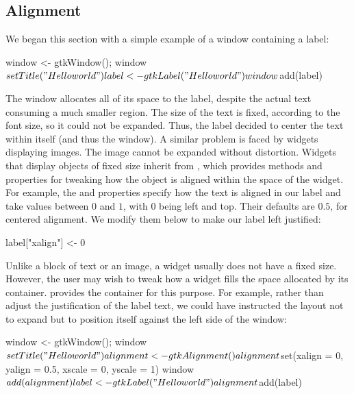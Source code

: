 \subsection{Alignment}
\label{sec:RGtk2:layout:align}

We began this section with a simple example of a window containing a
label:
\begin{Schunk}
\begin{Sinput}
 window <- gtkWindow(); window$setTitle("Hello world")
 label <- gtkLabel("Hello world")
 window$add(label)
\end{Sinput}
\end{Schunk}
%
The window allocates all of its space to the label, despite the actual
text consuming a much smaller region. The size of the text is fixed,
according to the font size, so it could not be expanded. Thus, the
label decided to center the text within itself (and thus the
window). A similar problem is faced by widgets displaying images. The
image cannot be expanded without distortion. Widgets that display
objects of fixed size inherit from , which provides
methods and properties for tweaking how the object is aligned within
the space of the widget. For example, the  and
 properties specify how the text is aligned in our label
and take values between $0$ and $1$, with $0$ being left and
top. Their defaults are $0.5$, for centered alignment. We modify them
below to make our label left justified:
\begin{Schunk}
\begin{Sinput}
 label["xalign"] <- 0
\end{Sinput}
\end{Schunk}
Unlike a block of text or an image, a widget usually does not have a
fixed size. However, the user may wish to tweak how a widget fills
the space allocated by its container.  \GTK\/ provides the
 container for this purpose. For example, rather
than adjust the justification of the label text, we could have
instructed the layout not to expand but to position itself against the
left side of the window:
\begin{Schunk}
\begin{Sinput}
 window <- gtkWindow(); window$setTitle("Hello world")
 alignment <- gtkAlignment()
 alignment$set(xalign = 0, yalign = 0.5, xscale = 0, yscale = 1)
 window$add(alignment)
 label <- gtkLabel("Hello world")
 alignment$add(label)
\end{Sinput}
\end{Schunk}

